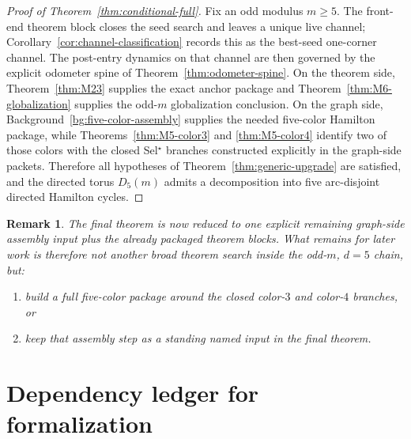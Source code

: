 \documentclass[11pt]{article}
\newtheorem{remark}[theorem]{Remark}
\begin{document}
\begin{proof}[Proof of Theorem~\ref{thm:conditional-full}]
Fix an odd modulus $m\ge 5$.
The front-end theorem block closes the seed search and leaves a unique live
channel; Corollary~\ref{cor:channel-classification} records this as the
best-seed one-corner channel.
The post-entry dynamics on that channel are then governed by the explicit
odometer spine of Theorem~\ref{thm:odometer-spine}.
On the theorem side, Theorem~\ref{thm:M23} supplies the exact anchor package
and Theorem~\ref{thm:M6-globalization} supplies the odd-$m$ globalization
conclusion.
On the graph side, Background~\ref{bg:five-color-assembly} supplies the needed
five-color Hamilton package, while Theorems~\ref{thm:M5-color3} and
\ref{thm:M5-color4} identify two of those colors with the closed Sel\(^{\star}\)
branches constructed explicitly in the graph-side packets.
Therefore all hypotheses of Theorem~\ref{thm:generic-upgrade} are satisfied,
and the directed torus $D_5(m)$ admits a decomposition into five arc-disjoint
directed Hamilton cycles.
\end{proof}

\begin{remark}
The final theorem is now reduced to one explicit remaining graph-side assembly
input plus the already packaged theorem blocks.
What remains for later work is therefore not another broad theorem search inside
the odd-$m$, $d=5$ chain, but:
\begin{enumerate}[label=\textup{(\arabic*)},leftmargin=2.8em]
\item build a full five-color package around the closed color-$3$ and
      color-$4$ branches, or
\item keep that assembly step as a standing named input in the final theorem.
\end{enumerate}
\end{remark}

\section{Dependency ledger for formalization}
\end{document}
